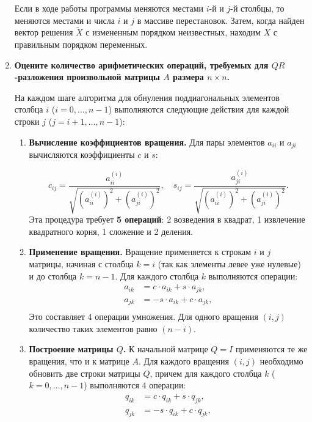 \documentclass[12pt, a4paper]{article}
\begin{document}
\begin{enumerate}
		Если в ходе работы программы меняются местами $i$-й и $j$-й столбцы, то меняются местами и числа $i$ и $j$ в массиве перестановок. Затем, когда найден вектор решения $\tilde{X}$ с измененным порядком неизвестных, находим $X$ с правильным порядком переменных.
		
		\item \textbf{Оцените количество арифметических операций, требуемых для $QR$-разложения произвольной матрицы $A$ размера $n\times n$.}
		
		 На каждом шаге алгоритма для обнуления поддиагональных элементов столбца $i$ ($i = 0, \dots, n-1$) выполняются следующие действия для каждой строки $j$ ($j = i+1, \dots, n-1$):
		
		\begin{enumerate}
			\item \textbf{Вычисление коэффициентов вращения.}
			Для пары элементов $a_{ii}$ и $a_{ji}$ вычисляются коэффициенты $c$ и $s$:
			
			\begin{equation*}
				c_{ij} = \frac{a_{ii}^{(i)}}{\sqrt{\left(a_{ii}^{(i)}\right)^2 + \left(a_{ji}^{(i)}\right)^2}}, \quad s_{ij} = \frac{a_{ji}^{(i)}}{\sqrt{\left(a_{ii}^{(i)}\right)^2 + \left(a_{ji}^{(i)}\right)^2}}.
			\end{equation*}
			Эта процедура требует \textbf{5 операций}: 2 возведения в квадрат, 1 извлечение квадратного корня, 1 сложение и 2 деления.
			
			\item \textbf{Применение вращения.}
			Вращение применяется к строкам $i$ и $j$ матрицы, начиная с столбца $k = i$ (так как элементы левее уже нулевые) и до столбца $k = n-1$. Для каждого столбца $k$ выполняются операции:
			\[
			\begin{aligned}
				a_{ik} &= c \cdot a_{ik} + s \cdot a_{jk}, \\
				a_{jk} &= -s \cdot a_{ik} + c \cdot a_{jk}, \\
			\end{aligned}
			\]
			Это составляет 4 операции умножения. Для одного вращения $(i, j)$ количество таких элементов равно $(n - i)$.
			\item \textbf{Построение матрицы $Q$.}
			К начальной матрице $Q = I$ применяются те же вращения, что и к матрице $A$. Для каждого вращения $(i, j)$ необходимо обновить две строки матрицы $Q$, причем для каждого столбца $k$ ($k = 0, \dots, n-1$) выполняются 4 операции:
			\[
			\begin{aligned}
				q_{ik} &= c \cdot q_{ik} + s \cdot q_{jk}, \\
				q_{jk} &= -s \cdot q_{ik} + c \cdot q_{jk}, \\
			\end{aligned}
			\]
		\end{enumerate}
		

\end{enumerate}
\end{document}
